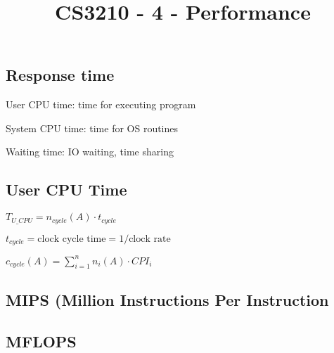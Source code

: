 \documentclass[12pt]{article}
\title{\textbf{CS3210 - 4 - Performance}}
\date{}
\begin{document}
\maketitle

\begin{spacing}{1.5}

\section{Response time}

\begin{itemize*}
	\item User CPU time: time for executing program
	\item System CPU time: time for OS routines
	\item Waiting time: IO waiting, time sharing
\end{itemize*}

\subsection{User CPU Time}

$T_{U\_CPU} = n_{cycle}(A) \cdot t_{cycle}$

\begin{itemize*}
	\item $t_{cycle} = \textrm{clock cycle time} = 1/\textrm{clock rate}$
\end{itemize*}

$c_{cycle}(A) = \sum_{i=1}^{n} n_{i}(A) \cdot CPI_{i}$

\begin{center}
\end{center}

\subsection{MIPS (Million Instructions Per Instruction}

\begin{center}
\end{center}

\begin{center}
\end{center}

\subsection{MFLOPS}


\end{spacing}
\end{document}
